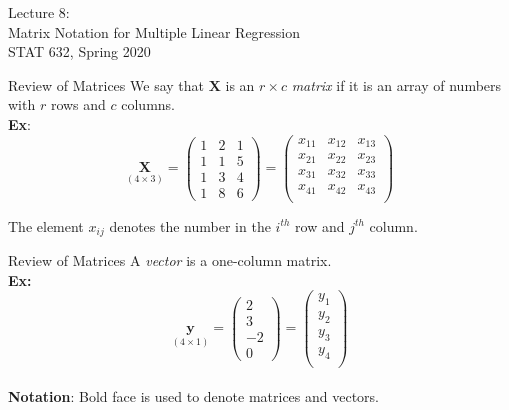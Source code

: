 \documentclass[11pt]{beamer}
\begin{document}
\begin{frame}
\large
Lecture 8:\\ 
Matrix Notation for Multiple Linear Regression\\
STAT 632, Spring 2020\\
\end{frame}

\begin{frame}{Review of Matrices}
We say that $\bm{X}$ is an $r \times c$ \emph{matrix} if it is an array of numbers with $r$ rows and $c$ columns.\\
\vspace{12pt}
\textbf{Ex}:
\[
\underset{(4 \times 3)}{\bm{X}} =
\begin{pmatrix}
1 & 2 & 1\\
1 & 1 & 5\\
1 & 3 & 4\\
1 & 8 & 6
\end{pmatrix}
=
\begin{pmatrix}
x_{11} & x_{12} & x_{13}\\
x_{21} & x_{22} & x_{23}\\
x_{31} & x_{32} & x_{33}\\
x_{41} & x_{42} & x_{43}\\
\end{pmatrix}
\]

\vspace{12pt}
The element $x_{ij}$ denotes the number in the $i^{th}$ row and $j^{th}$ column.\\
\end{frame}

\begin{frame}{Review of Matrices}
A \emph{vector} is a one-column matrix.\\
\vspace{12pt}
\textbf{Ex:}
\[
\underset{(4 \times 1)}{\bm{y}} =
\begin{pmatrix}
2\\
3\\
-2\\
0
\end{pmatrix}
=
\begin{pmatrix}
y_1\\
y_2\\
y_3\\
y_4\\
\end{pmatrix}
\]\\
\vspace{12pt}
\textbf{Notation}: Bold face is used to denote matrices and vectors.\\
\end{frame}
\end{document}
